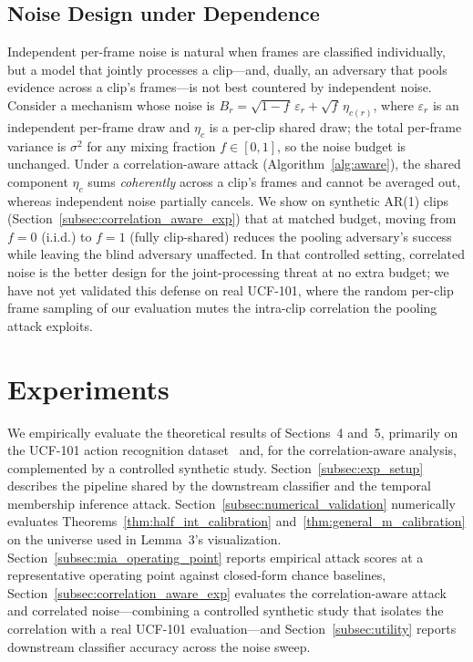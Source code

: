 \documentclass[sigconf,anonymous, review]{acmart}
\begin{document}
\subsection{Noise Design under Dependence}
\label{subsec:correlated_noise}

Independent per-frame noise is natural when frames are classified individually, but a model that jointly processes a clip---and, dually, an adversary that pools evidence across a clip's frames---is not best countered by independent noise. Consider a mechanism whose noise is $B_r = \sqrt{1-f}\,\varepsilon_r + \sqrt{f}\,\eta_{c(r)}$, where $\varepsilon_r$ is an independent per-frame draw and $\eta_c$ is a per-clip shared draw; the total per-frame variance is $\sigma^2$ for any mixing fraction $f \in [0,1]$, so the noise budget is unchanged. Under a correlation-aware attack (Algorithm~\ref{alg:aware}), the shared component $\eta_c$ sums \emph{coherently} across a clip's frames and cannot be averaged out, whereas independent noise partially cancels. We show on synthetic AR(1) clips (Section~\ref{subsec:correlation_aware_exp}) that at matched budget, moving from $f=0$ (i.i.d.) to $f=1$ (fully clip-shared) reduces the pooling adversary's success while leaving the blind adversary unaffected. In that controlled setting, correlated noise is the better design for the joint-processing threat at no extra budget; we have not yet validated this defense on real UCF-101, where the random per-clip frame sampling of our evaluation mutes the intra-clip correlation the pooling attack exploits.

\section{Experiments}
\label{sec:experiments}

We empirically evaluate the theoretical results of Sections~4 and~5, primarily on the UCF-101 action recognition dataset~\cite{soomro2012ucf101} and, for the correlation-aware analysis, complemented by a controlled synthetic study. Section~\ref{subsec:exp_setup} describes the pipeline shared by the downstream classifier and the temporal membership inference attack. Section~\ref{subsec:numerical_validation} numerically evaluates Theorems~\ref{thm:half_int_calibration} and~\ref{thm:general_m_calibration} on the universe used in Lemma~3's visualization. Section~\ref{subsec:mia_operating_point} reports empirical attack scores at a representative operating point against closed-form chance baselines, Section~\ref{subsec:correlation_aware_exp} evaluates the correlation-aware attack and correlated noise---combining a controlled synthetic study that isolates the correlation with a real UCF-101 evaluation---and Section~\ref{subsec:utility} reports downstream classifier accuracy across the noise sweep.
\end{document}
